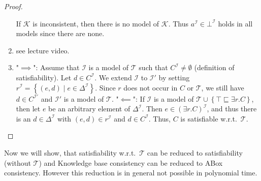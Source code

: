 \begin{proof}
\begin{enumerate}
			If $\mathcal{K}$ is inconsistent, then there is no model of $\mathcal{K}$.
			Thus $a^{\mathcal{I}} \in \bot^\mathcal{I}$ holds in all models since there are none.
		\item see lecture video.
		\item "$ \implies$": \newline
			Assume that $\mathcal{I}$ is a model of $\mathcal{T}$ such that $C^\mathcal{I} \neq \emptyset$
			(definition of satisfiability).
			Let $d \in C^{\mathcal{I}}$.
			We extend $\mathcal{I}$ to $\mathcal{I}'$ by setting $r^{\mathcal{I}} = \left\{ (e,d) \mid  e \in \Delta^{\mathcal{I}} \right\}$.
			Since $r$ does not occur in $C$ or $\mathcal{T}$, we still have $d \in C^\mathcal{I'}$ and $\mathcal{I'}$ is a model of $\mathcal{T}$. \newline
			"$\impliedby$": \newline
			If $\mathcal{I}$ is a model of $\mathcal{T} \cup \left\{ \top \sqsubseteq \exists r.C \right\}$,
			then let $e$ be an arbitrary element of $\Delta^{\mathcal{I}}$.
			Then $e \in \left( \exists r.C \right)^{\mathcal{I}}$, and thus there is an $d \in \Delta^{\mathcal{I}}$ 
			with $\left( e,d \right) \in r^{\mathcal{I}}$ and $d \in C^\mathcal{I}$.
			Thus, $C$ is satisfiable w.r.t.\ $\mathcal{T}$.
			\qedhere
	\end{enumerate}
\end{proof}

Now we will show, that satisfiability w.r.t.\ $\mathcal{T}$ can be reduced to satisfiability (without $\mathcal{T}$) and
Knowledge base consistency can be reduced to ABox consistency.
However this reduction is in general not possible in polynomial time.

